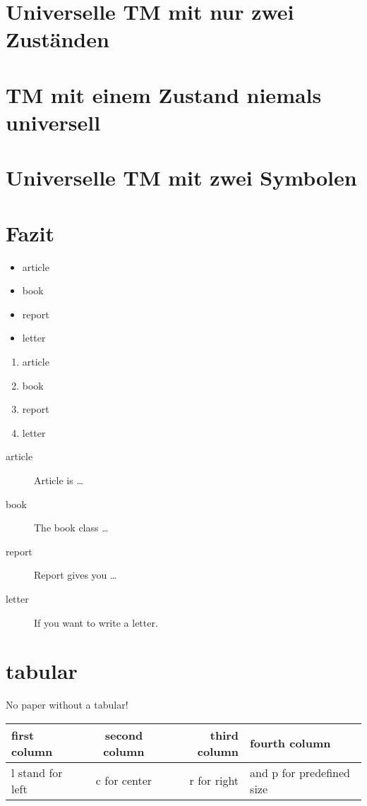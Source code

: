 \documentclass[12pt, a4paper, twoside]{article}
\begin{document}
\section{Universelle TM mit nur zwei Zuständen}

\section{TM mit einem Zustand niemals universell}

\section{Universelle TM mit zwei Symbolen}

\section{Fazit}


\begin{itemize}
\item article
\item book 
\item report 
\item letter 
\end{itemize}


\begin{enumerate}
\item article
\item book 
\item report 
\item letter 
\end{enumerate}

\begin{description}
\item[article\label{article}]{Article is \ldots}
\item[book\label{book}]{The book class \ldots}
\item[report\label{report}]{Report gives you \ldots}
\item[letter\label{letter}]{If you want to write a letter.}
\end{description}

\section{tabular}
No paper without a tabular!

\begin{tabular}{|l|c|r|p{2cm}|}
\hline
first column & second column & third column & fourth column \\
\hline 
l stand for left & c for center & r for right & and p for predefined size \\
\hline 
\end{tabular} 
\end{document}
